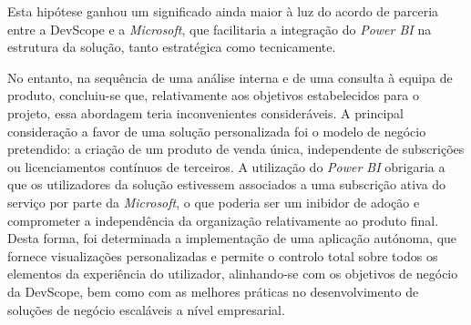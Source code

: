 Esta hipótese ganhou um significado ainda maior à luz do acordo de parceria entre a DevScope e a \textit{Microsoft}, que facilitaria a integração do \textit{Power BI} na estrutura da solução, tanto estratégica como tecnicamente.

No entanto, na sequência de uma análise interna e de uma consulta à equipa de produto, concluiu-se que, relativamente aos objetivos estabelecidos para o projeto, essa abordagem teria inconvenientes consideráveis. A principal consideração a favor de uma solução personalizada foi o modelo de negócio pretendido: a criação de um produto de venda única, independente de subscrições ou licenciamentos contínuos de terceiros. A utilização do \textit{Power BI} obrigaria a que os utilizadores da solução estivessem associados a uma subscrição ativa do serviço por parte da \textit{Microsoft}, o que poderia ser um inibidor de adoção e comprometer a independência da organização relativamente ao produto final. Desta forma, foi determinada a implementação de uma aplicação autónoma, que fornece visualizações personalizadas e permite o controlo total sobre todos os elementos da experiência do utilizador, alinhando-se com os objetivos de negócio da DevScope, bem como com as melhores práticas no desenvolvimento de soluções de negócio escaláveis a nível empresarial.